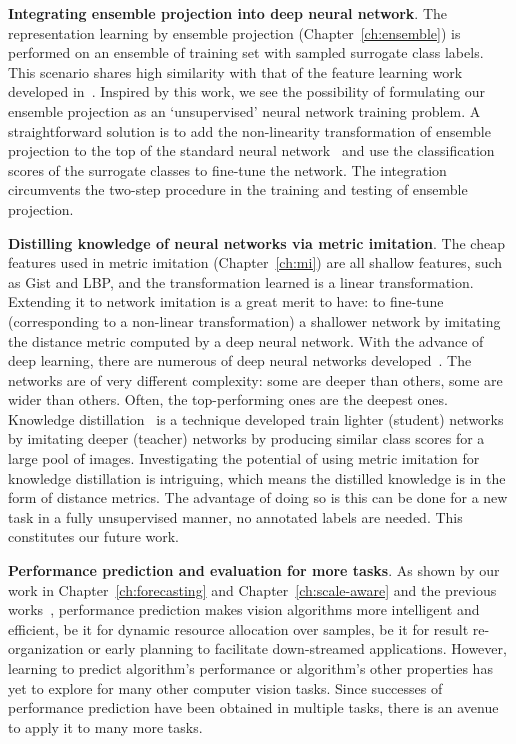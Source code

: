 \textbf{Integrating ensemble projection into deep neural network}. The  representation learning by ensemble projection (Chapter~\ref{ch:ensemble}) is performed on an ensemble of training set with sampled surrogate class labels. This scenario shares high similarity with that of the feature learning work developed in~\citep{cnnfet14}. Inspired by this work, we see the possibility of formulating our ensemble projection as an `unsupervised' neural network training problem. A straightforward solution  is to add the non-linearity transformation of ensemble projection to the top of the standard neural network~\citep{deep:bmvc14} and use the classification scores of the surrogate classes to fine-tune the network.  The integration circumvents the two-step procedure in the training and testing of ensemble projection.   


\textbf{Distilling knowledge of neural networks via metric imitation}. The cheap features used in metric imitation (Chapter~\ref{ch:mi}) are all shallow features, such as Gist and LBP, and the transformation learned is a linear transformation. Extending it to network imitation is a great merit to have: to fine-tune (corresponding to a non-linear transformation) a shallower network by imitating the distance metric computed by a deep neural network. 
With the advance of deep learning, there are numerous of deep neural networks developed~\citep{deepnet:nips12, vgg16, googlenet, ResNet}. The networks are of very different complexity: some are deeper than others, some are wider than others. Often, the top-performing ones  are the deepest ones. 
Knowledge distillation~\citep{DistillingCNN} is a technique developed train lighter (student) networks by imitating deeper (teacher) networks by producing similar class scores for a large pool of images.  Investigating the potential of using metric imitation for knowledge distillation is intriguing, which means the distilled knowledge is in the form of distance metrics. The advantage of doing so is this can be done for a new task in a fully unsupervised manner, \ie no annotated labels are needed.  This constitutes our future work. 


\textbf{Performance prediction and evaluation for more tasks}. As shown by our work in Chapter~\ref{ch:forecasting} and Chapter~\ref{ch:scale-aware} and the previous works~\citep{matchability, flow:confidence, completion:quality}, performance prediction makes vision algorithms more intelligent and efficient, be it for dynamic resource allocation over samples, be it for result re-organization or early planning to facilitate down-streamed applications. However, learning to predict algorithm's performance or algorithm's other properties has yet to explore for many other computer vision tasks. Since successes of performance prediction have been obtained in multiple tasks, there is an avenue to apply it to many more tasks. 

